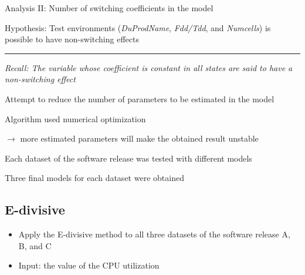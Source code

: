 \documentclass{beamer}
\begin{document}
\begin{frame}[fragile]
Analysis II: Number of switching coefficients in the model

Hypothesis: Test environments (\textit{DuProdName}, \textit{Fdd/Tdd}, and \textit{Numcells}) is possible to have non-switching effects
\rule{\textwidth}{0.4pt}

\begin{itemize}
	\item \small{\textit{Recall: The variable whose coefficient is \textit{constant} in all states are said to have a non-switching effect}}
	
	\item \normalsize{Attempt to reduce the number of parameters to be estimated in the model
	\item Algorithm used numerical optimization
	
	$\rightarrow$ more estimated parameters will make the obtained result unstable 
	
	\item Each dataset of the software release was tested with different models
	\item Three final models for each dataset were obtained}
\end{itemize}


\end{frame}

\subsection{E-divisive}
\begin{frame}

\begin{itemize}
	\item Apply the E-divisive method to all three datasets of the software release A, B, and C
	\item Input: the value of the CPU utilization
\end{itemize}

\end{frame}

\end{document}
